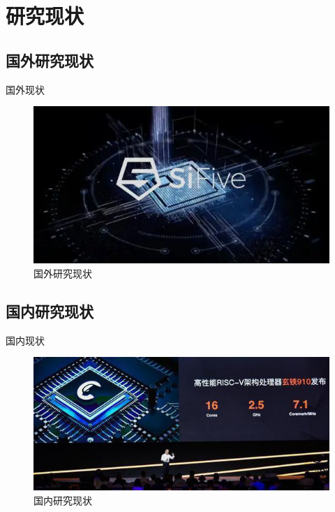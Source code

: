 \documentclass{beamer}
\begin{document}
\section{研究现状}

\subsection{国外研究现状}

\begin{frame}{国外现状}
    \begin{figure}
        \centering
        \includegraphics[height=0.6\textheight]{pic/SiFive.png}
        \caption{国外研究现状}
    \end{figure}
 
\end{frame}

\subsection{国内研究现状}

\begin{frame}{国内现状}
    \begin{figure}
        \centering
        \includegraphics[height=0.6\textheight]{pic/阿里_Android.jpeg}
        \caption{国内研究现状}
    \end{figure}
 
\end{frame}
\end{document}
